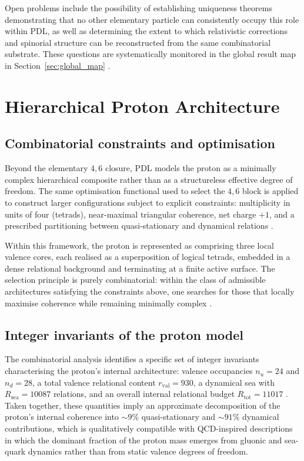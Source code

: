 \documentclass{article}
\begin{document}
Open problems include the possibility of establishing uniqueness theorems demonstrating that no other elementary particle can consistently occupy this role within PDL, as well as determining the extent to which relativistic corrections and spinorial structure can be reconstructed from the same combinatorial substrate. These questions are systematically monitored in the global result map in Section~\ref{sec:global_map} \cite{PDL_position}.

\section{Hierarchical Proton Architecture}
\label{sec:proton_architecture}

\subsection{Combinatorial constraints and optimisation}
\label{subsec:proton_constraints}

Beyond the elementary \(4,6\) closure, PDL models the proton as a minimally complex hierarchical composite rather than as a structureless effective degree of freedom. The same optimisation functional used to select the \(4,6\) block is applied to construct larger configurations subject to explicit constraints: multiplicity in units of four (tetrads), near-maximal triangular coherence, net charge \(+1\), and a prescribed partitioning between quasi-stationary and dynamical relations \cite{PDL_Main_2026,Combinatorial_Proton_v2_2026}.

Within this framework, the proton is represented as comprising three local valence cores, each realised as a superposition of logical tetrads, embedded in a dense relational background and terminating at a finite active surface. The selection principle is purely combinatorial: within the class of admissible architectures satisfying the constraints above, one searches for those that locally maximise coherence while remaining minimally complex \cite{Combinatorial_Proton_v2_2026,PDL_intro}.

\subsection{Integer invariants of the proton model}
\label{subsec:proton_integers}

The combinatorial analysis identifies a specific set of integer invariants characterising the proton’s internal architecture: valence occupancies \(n_u = 24\) and \(n_d = 28\), a total valence relational content \(r_{\mathrm{val}} = 930\), a dynamical sea with \(R_{\mathrm{sea}} = 10087\) relations, and an overall internal relational budget \(R_{\mathrm{tot}} = 11017\) \cite{Combinatorial_Proton_v2_2026,PDL_intro}. Taken together, these quantities imply an approximate decomposition of the proton’s internal coherence into \(\sim 9\%\) quasi-stationary and \(\sim 91\%\) dynamical contributions, which is qualitatively compatible with QCD-inspired descriptions in which the dominant fraction of the proton mass emerges from gluonic and sea-quark dynamics rather than from static valence degrees of freedom.
\end{document}
